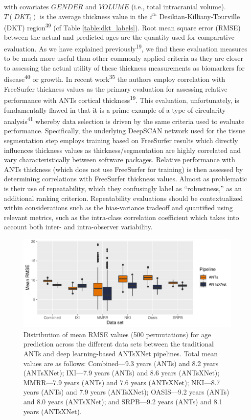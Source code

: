 \documentclass[12pt,]{article}
\begin{document}
with covariates \(GENDER\) and \(VOLUME\) (i.e., total intracranial
volume). \(T(DKT_i)\) is the average thickness value in the \(i^{th}\)
Desikian-Killiany-Tourville (DKT) region\textsuperscript{39} (cf Table
\ref{table:dkt_labels}). Root mean square error (RMSE) between the
actual and predicted ages are the quantity used for comparative
evaluation. As we have explained previously\textsuperscript{19}, we find
these evaluation measures to be much more useful than other commonly
applied criteria as they are closer to assessing the actual utility of
these thickness measurements as biomarkers for
disease\textsuperscript{40} or growth. In recent
work\textsuperscript{35} the authors employ correlation with FreeSurfer
thickness values as the primary evaluation for assessing relative
performance with ANTs cortical thickness\textsuperscript{19}. This
evaluation, unfortunately, is fundamentally flawed in that it is a prime
example of a type of circularity analysis\textsuperscript{41} whereby
data selection is driven by the same criteria used to evaluate
performance. Specifically, the underlying DeepSCAN network used for the
tissue segmentation step employs training based on FreeSurfer results
which directly influences thickness values as thickness/segmentation are
highly correlated and vary characteristically between software packages.
Relative performance with ANTs thickness (which does not use FreeSurfer
for training) is then assessed by determining correlations with
FreeSurfer thickness values. Almost as problematic is their use of
repeatability, which they confusingly label as ``robustness,'' as an
additional ranking criterion. Repeatability evaluations should be
contextualized within considerations such as the bias-variance tradeoff
and quantified using relevant metrics, such as the intra-class
correlation coefficient which takes into account both inter- and
intra-observer variability.

\begin{figure}[htb]
  \centering
    \includegraphics[width=\textwidth]{Figures/rmseThicknessPerSite.pdf}
  \caption{Distribution of mean RMSE values (500 permutations) for age
          prediction across the different data sets between
          the traditional ANTs and deep learning-based ANTsXNet pipelines. Total
          mean values are as follows: Combined---9.3 years (ANTs) and 8.2 years
          (ANTsXNet); IXI---7.9 years (ANTs) and 8.6 years (ANTsXNet);
          MMRR---7.9 years (ANTs) and 7.6 years (ANTsXNet); NKI---8.7 years
          (ANTs) and 7.9 years (ANTsXNet); OASIS---9.2 years (ANTs) and 8.0
          years (ANTsXNet); and SRPB---9.2 years (ANTs) and 8.1 years
          (ANTsXNet).}
  \label{fig:agePrediction}
\end{figure}
\end{document}
